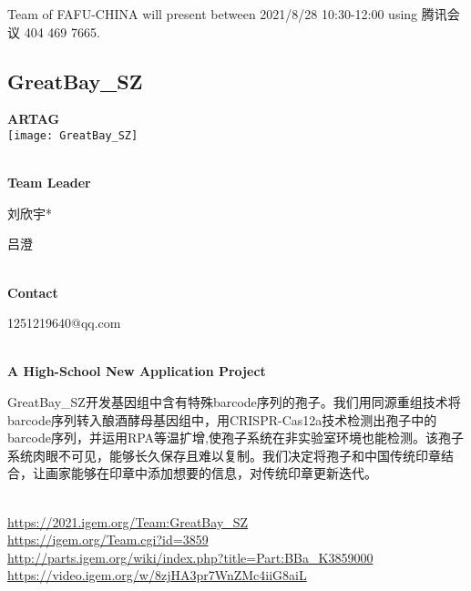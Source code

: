 \vfill{}









Team of FAFU-CHINA will present between     2021/8/28 10:30-12:00    using 腾讯会议 404 469 7665.
\newpage


\subsection{\textcolor{Blu}{ GreatBay\_SZ } }
\vspace{5mm}
\begin{center}
\large{
  \textbf{ ARTAG }\\

  \texttt{[image: GreatBay\_SZ]}
}
\end{center}
\textbf{\\Team Leader}

  刘欣宇*

  吕澄


\textbf{\\Contact}

  1251219640@qq.com


\textbf{\\A High-School New Application Project\\}\begin{spacing}{1.5}

GreatBay\_SZ开发基因组中含有特殊barcode序列的孢子。我们用同源重组技术将barcode序列转入酿酒酵母基因组中，用CRISPR-Cas12a技术检测出孢子中的barcode序列，并运用RPA等温扩增,使孢子系统在非实验室环境也能检测。该孢子系统肉眼不可见，能够长久保存且难以复制。我们决定将孢子和中国传统印章结合，让画家能够在印章中添加想要的信息，对传统印章更新迭代。\end{spacing}
\\

\url{https://2021.igem.org/Team:GreatBay\_SZ }\\
\url{https://igem.org/Team.cgi?id=3859 }\\
\url{http://parts.igem.org/wiki/index.php?title=Part:BBa_K3859000 }\\
\url{https://video.igem.org/w/8zjHA3pr7WnZMc4iiG8aiL }\\

\vfill{}









